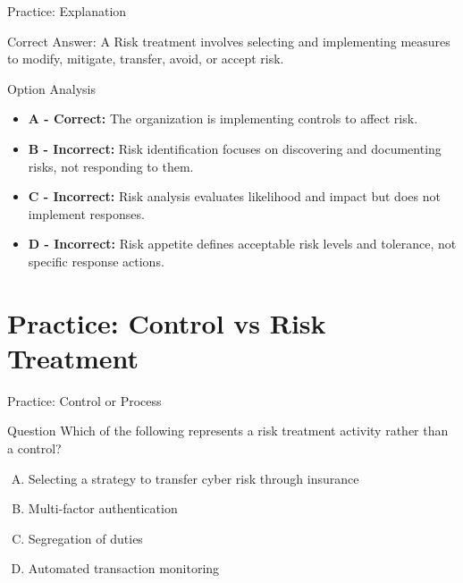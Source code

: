\documentclass{beamer}
\begin{document}
	\begin{frame}{Practice: Explanation}
		\begin{block}{Correct Answer: A}
			Risk treatment involves selecting and implementing measures to modify, mitigate, transfer, avoid, or accept risk.
		\end{block}
		\begin{block}{Option Analysis}
			\begin{itemize}
				\item \textbf{A - Correct:} The organization is implementing controls to affect risk.
				\item \textbf{B - Incorrect:} Risk identification focuses on discovering and documenting risks, not responding to them.
				\item \textbf{C - Incorrect:} Risk analysis evaluates likelihood and impact but does not implement responses.
				\item \textbf{D - Incorrect:} Risk appetite defines acceptable risk levels and tolerance, not specific response actions.
			\end{itemize}
		\end{block}
	\end{frame}
	
	

	
	\section{Practice: Control vs Risk Treatment}
	
	\begin{frame}{Practice: Control or Process}
		\begin{block}{Question}
			Which of the following represents a risk treatment activity rather than a control?
		\end{block}
		\begin{enumerate}[(A)]
			\item Selecting a strategy to transfer cyber risk through insurance
			\item Multi-factor authentication
			\item Segregation of duties
			\item Automated transaction monitoring
		\end{enumerate}
	\end{frame}
	
\end{document}
